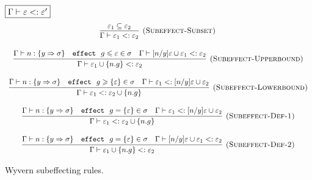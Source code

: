 \begin{figure}[htb]
\flushleft
\footnotesize{
\noindent$\fbox{$\Gamma \vdash \varepsilon <: \varepsilon'$}$
\[
\begin{array}{c}
\hspace{-2pt}
\infer[\textsc{(Subeffect-Subset)}]
    {\Gamma   \vdash \varepsilon_1 <: \varepsilon_2}
    {\varepsilon_1 \subseteq \varepsilon_2}\\[3ex]
\infer[\textsc{(Subeffect-Upperbound)}]
    {\Gamma   \vdash \varepsilon_1\cup\{n.g\} <: \varepsilon_2}
    {\Gamma   \vdash n:\{y \Rightarrow \sigma\} \quad \keyw{effect} \ g \leqslant \varepsilon \in \sigma \quad \Gamma   \vdash [n/y]\varepsilon \cup \varepsilon_1 <: \varepsilon_2 }\\[3ex]
\infer[\textsc{(Subeffect-Lowerbound)}]
    {\Gamma  \vdash \varepsilon_1<: \varepsilon_2\cup\{n.g\} }
    {\Gamma   \vdash n:\{y \Rightarrow \sigma\} \quad \keyw{effect}\ g \geqslant \{\varepsilon\} \in \sigma \quad \Gamma   \vdash \varepsilon_1 <: [n/y]\varepsilon \cup \varepsilon_2}\\[3ex]
\infer[\textsc{(Subeffect-Def-1)}]
    {\Gamma   \vdash \varepsilon_1<: \varepsilon_2\cup\{n.g\} }
    {\Gamma   \vdash n:\{y \Rightarrow \sigma\} \quad \keyw{effect}\ g = \{\varepsilon\} \in \sigma \quad \Gamma   \vdash \varepsilon_1 <: [n/y]\varepsilon \cup \varepsilon_2}\\[3ex]
\infer[\textsc{(Subeffect-Def-2)}]
    {\Gamma  \vdash \varepsilon_1\cup\{n.g\} <: \varepsilon_2}
    {\Gamma  \vdash n:\{y \Rightarrow \sigma\} \quad \keyw{effect}\ g = \{\varepsilon\} \in \sigma \quad \Gamma  \vdash [n/y]\varepsilon \cup \varepsilon_1 <: \varepsilon_2 }%
\end{array}
\]
}
\caption{Wyvern subeffecting rules.}
\label{f-subeffecting}
\end{figure}

